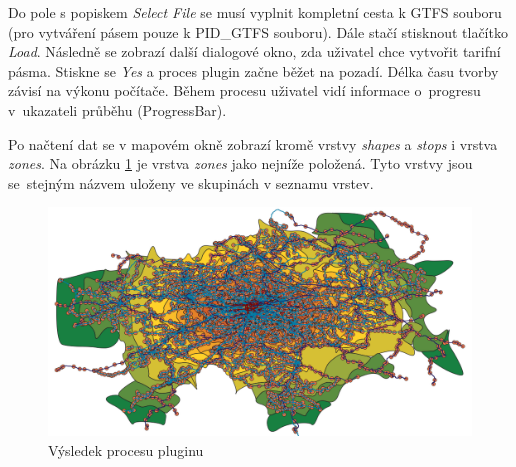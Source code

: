 Do pole s popiskem \textit{Select File} se musí vyplnit kompletní cesta k GTFS  souboru 
(pro vytváření pásem pouze k PID\_GTFS  souboru). Dále stačí stisk\-nout tlačítko \textit{Load}.
Následně se zobrazí další dialogové okno, zda uživatel chce vytvořit tarifní pásma. Stiskne se
\textit{Yes} a proces plugin začne běžet na pozadí. Délka času tvorby závisí na výkonu počítače. 
Během procesu uživatel vidí informace o~progresu v~ukazateli průběhu (ProgressBar). 

Po načtení dat se v mapovém okně zobrazí kromě vrstvy \textit{shapes} a \textit{stops} i vrstva 
\textit{zones}. Na obrázku \ref{fig:gtfs_loader_vysledek} je vrstva \textit{zones}
jako nejníže položená. Tyto vrstvy jsou se~stejným názvem uloženy ve skupinách v seznamu vrstev.

\begin{figure}[H] \centering
    \includegraphics[width=400pt]{./pictures-dodatek/visualization.png}
    \caption[Výsledek procesu pluginu]{Výsledek procesu pluginu}
	\label{fig:gtfs_loader_vysledek}              
\end{figure} 